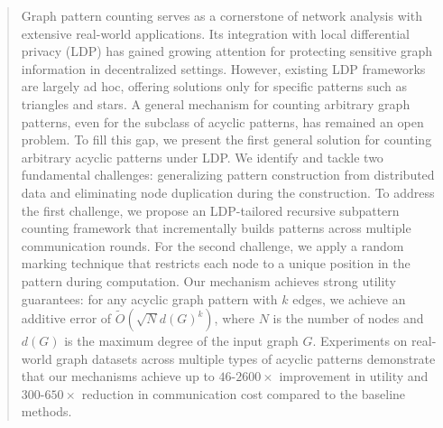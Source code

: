 \begin{abstract}
Graph pattern counting serves as a cornerstone of network analysis with extensive real-world applications.
Its integration with local differential privacy (LDP) has gained growing attention for protecting sensitive graph information in decentralized settings.
However, existing LDP frameworks are largely ad hoc, offering solutions only for specific patterns such as triangles and stars. 
A general mechanism for counting arbitrary graph patterns, even for the subclass of acyclic patterns, has remained an open problem.
To fill this gap, we present the first general solution for counting arbitrary acyclic patterns under LDP. 
We identify and tackle two fundamental challenges: generalizing pattern construction from distributed data and eliminating node duplication during the construction. 
To address the first challenge, we propose an LDP-tailored recursive subpattern counting framework that incrementally builds patterns across multiple communication rounds.
For the second challenge, we apply a random marking technique that restricts each node to a unique position in the pattern during computation.
Our mechanism achieves strong utility guarantees: for any acyclic graph pattern with $k$ edges, we achieve an additive error of $\tilde{O}(\sqrt{N}d(G)^k)$, where $N$ is the number of nodes and $d(G)$ is the maximum degree of the input graph $G$.
Experiments on real-world graph datasets across multiple types of acyclic patterns demonstrate that our mechanisms achieve up to ${46}$-${2600}\times$ improvement in utility and ${300}$-$650\times$ reduction in communication cost compared to the baseline methods.

\end{abstract}